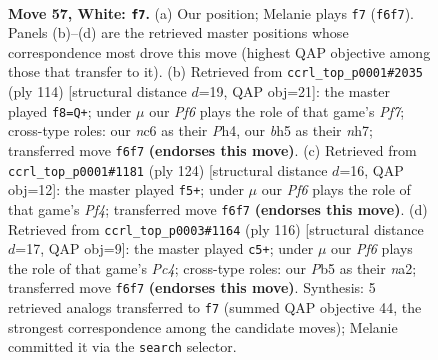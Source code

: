 \documentclass[11pt]{article}
\begin{document}
\clearpage

\begin{figure}[p]\centering
\begin{subfigure}{0.46\textwidth}\centering
\resizebox{\linewidth}{!}{%
\newchessgame
\chessboard[
  setfen={2k5/8/2n2P2/1P5b/8/2Br4/7K/5R2 w - - 1 57},
  showmover=false,
  pgfstyle=straightmove, color=movearrow, markmove={f6-f7}
]}
\caption{}
\end{subfigure}\hfill
\begin{subfigure}{0.46\textwidth}\centering
\resizebox{\linewidth}{!}{%
\newchessgame
\chessboard[
  setfen={R7/5P1n/5k1p/8/1rB4P/6K1/8/8 w - - 2 58},
  showmover=false,
  pgfstyle=straightmove, color=movearrow, markmove={f7-f8}
]}
\caption{}
\end{subfigure}
\\[4pt]
\begin{subfigure}{0.46\textwidth}\centering
\resizebox{\linewidth}{!}{%
\newchessgame
\chessboard[
  setfen={8/8/3b2k1/8/R4PK1/2r1B3/8/8 w - - 1 63},
  showmover=false,
  pgfstyle=straightmove, color=movearrow, markmove={f4-f5}
]}
\caption{}
\end{subfigure}\hfill
\begin{subfigure}{0.46\textwidth}\centering
\resizebox{\linewidth}{!}{%
\newchessgame
\chessboard[
  setfen={8/8/3kB1R1/8/K1P5/4r3/n7/8 w - - 13 59},
  showmover=false,
  pgfstyle=straightmove, color=movearrow, markmove={c4-c5}
]}
\caption{}
\end{subfigure}
\caption{\textbf{Move 57, White: \texttt{f7}.} (a) Our position; Melanie plays \texttt{f7} (\texttt{f6f7}). Panels (b)--(d) are the retrieved master positions whose correspondence most drove this move (highest QAP objective among those that transfer to it). (b) Retrieved from \texttt{ccrl\_top\_p0001\#2035} (ply 114) [structural distance $d$=19, QAP obj=21]: the master played \texttt{f8=Q+}; under $\mu$ our \emph{Pf6} plays the role of that game's \emph{Pf7}; cross-type roles: our \emph{n}c6 as their \emph{P}h4, our \emph{b}h5 as their \emph{n}h7; transferred move \texttt{f6f7} \textbf{(endorses this move)}. (c) Retrieved from \texttt{ccrl\_top\_p0001\#1181} (ply 124) [structural distance $d$=16, QAP obj=12]: the master played \texttt{f5+}; under $\mu$ our \emph{Pf6} plays the role of that game's \emph{Pf4}; transferred move \texttt{f6f7} \textbf{(endorses this move)}. (d) Retrieved from \texttt{ccrl\_top\_p0003\#1164} (ply 116) [structural distance $d$=17, QAP obj=9]: the master played \texttt{c5+}; under $\mu$ our \emph{Pf6} plays the role of that game's \emph{Pc4}; cross-type roles: our \emph{P}b5 as their \emph{n}a2; transferred move \texttt{f6f7} \textbf{(endorses this move)}. Synthesis: 5 retrieved analogs transferred to \texttt{f7} (summed QAP objective 44, the strongest correspondence among the candidate moves); Melanie committed it via the \texttt{search} selector.}
\label{fig:thought-m112}
\end{figure}
\end{document}

